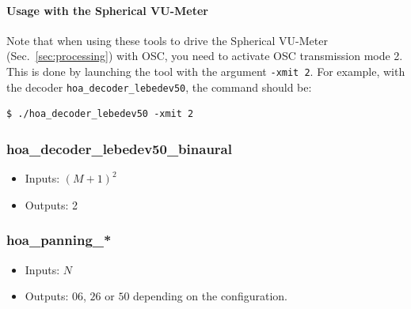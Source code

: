 \documentclass[10pt,a4paper]{article}
\begin{document}
\paragraph{Usage with the Spherical VU-Meter}
Note that when using these tools to drive the Spherical VU-Meter (Sec.~\ref{sec:processing}) with OSC, you need to activate OSC transmission mode 2. This is done by launching the tool with the argument \lstinline'-xmit 2'. For example, with the decoder \lstinline'hoa_decoder_lebedev50', the command should be:
\begin{lstlisting}
$ ./hoa_decoder_lebedev50 -xmit 2
\end{lstlisting}
\pagebreak

\subsubsection{hoa\_decoder\_lebedev50\_binaural}
\begin{itemize}
\item Inputs: $(M+1)^2$
\item Outputs: 2
\end{itemize}
\pagebreak

\subsubsection{hoa\_panning\_*}
\label{section:hoa_panning}
\begin{itemize}
\item Inputs: $N$
\item Outputs: $06$, $26$ or $50$ depending on the configuration.
\end{itemize}
\end{document}
